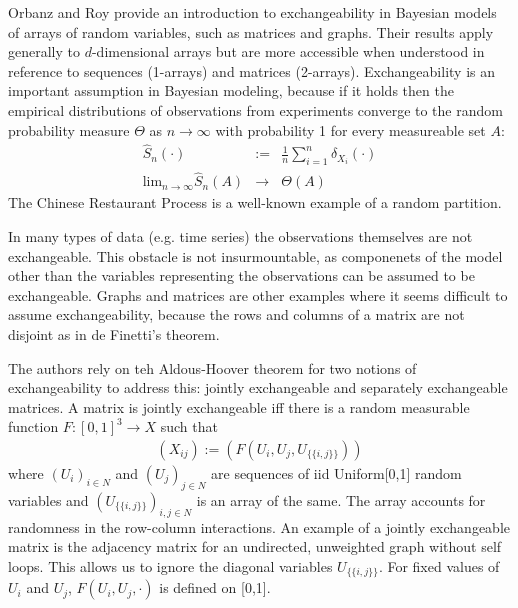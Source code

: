 \documentclass[12pt,letterpaper]{article}
\begin{document}

Orbanz and Roy provide an introduction to exchangeability in Bayesian models of arrays of random variables, such as matrices and graphs. Their results apply generally to $d$-dimensional arrays but are more accessible when understood in reference to sequences (1-arrays) and matrices (2-arrays). Exchangeability is an important assumption in Bayesian modeling, because if it holds then the empirical distributions of observations from experiments converge to the random probability measure $\Theta$ as $n \rightarrow \infty$ with probability 1 for every measureable set $A$:
\begin{eqnarray*}
\hat{S}_n(\cdot) &:=& \frac{1}{n} \sum_{i=1}^n \delta_{X_i} (\cdot) \\
\text{lim}_{n \rightarrow \infty} \hat{S}_n(A) &\rightarrow& \Theta (A)
\end{eqnarray*}
The Chinese Restaurant Process is a well-known example of a random partition. 

In many types of data (e.g. time series) the observations themselves are not exchangeable. This obstacle is not insurmountable, as componenets of the model other than the variables representing the observations can be assumed to be exchangeable. Graphs and matrices are other examples where it seems difficult to assume exchangeability, because the rows and columns of a matrix are not disjoint as in de Finetti's theorem. 

The authors rely on teh Aldous-Hoover theorem for two notions of exchangeability to address this: jointly exchangeable and separately exchangeable matrices. A matrix is jointly exchangeable iff there is a random measurable function $F : [0,1]^3 \rightarrow X$ such that 
\begin{eqnarray}
(X_{ij}) := (F(U_i, U_j, U_{\{\{ i,j \}\}}))
\end{eqnarray}
where $(U_i)_{i \in N}$ and $(U_j)_{j \in N}$ are sequences of iid Uniform[0,1] random variables and $(U_{\{\{ i,j \}\}})_{i,j \in N}$ is an array of the same. The array accounts for randomness in the row-column interactions. An example of a jointly exchangeable matrix is the adjacency matrix for an undirected, unweighted graph without self loops. This allows us to ignore the diagonal variables $U_{\{\{ i,j \}\}}$. For fixed values of $U_i$ and $U_j$, $F(U_i, U_j, \cdot)$ is defined on [0,1].
\end{document}
